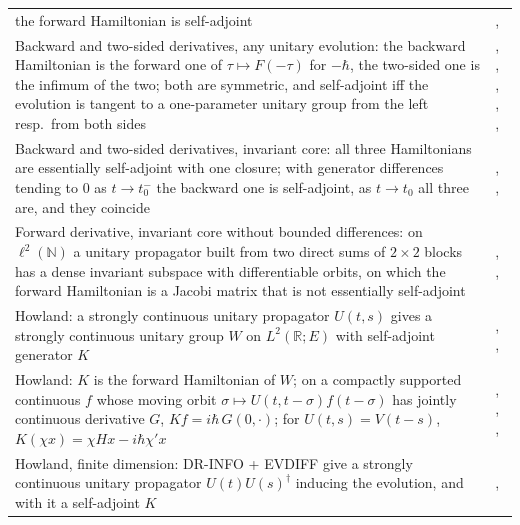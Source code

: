 \documentclass[11pt]{article}
\begin{document}
\begin{xltabular}{\textwidth}{@{}BL@{}}
  the forward Hamiltonian is self-adjoint &
  ,  \\
Backward and two-sided derivatives, any unitary evolution: the backward Hamiltonian is the
  forward one of $\tau \mapsto F(-\tau)$ for $-\hbar$, the two-sided one is the infimum of the
  two; both are symmetric, and self-adjoint iff the evolution is tangent to a one-parameter
  unitary group from the left resp.\ from both sides &
  , ,
  , ,
  ,  \\
Backward and two-sided derivatives, invariant core: all three Hamiltonians are essentially
  self-adjoint with one closure; with generator differences tending to $0$ as $t \to t_0^-$
  the backward one is self-adjoint, as $t \to t_0$ all three are, and they coincide &
  , ,
   \\
Forward derivative, invariant core without bounded differences: on $\ell^2(\mathbb{N})$ a
  unitary propagator built from two direct sums of $2 \times 2$ blocks has a dense invariant
  subspace with differentiable orbits, on which the forward Hamiltonian is a Jacobi matrix that
  is not essentially self-adjoint &
  , ,
   \\
Howland: a strongly continuous unitary propagator $U(t,s)$ gives a strongly continuous unitary
  group $W$ on $L^2(\mathbb{R};E)$ with self-adjoint generator $K$ &
  , ,
   \\
Howland: $K$ is the forward Hamiltonian of $W$; on a compactly supported continuous $f$ whose
  moving orbit $\sigma \mapsto U(t,t-\sigma)f(t-\sigma)$ has jointly continuous derivative $G$,
  $Kf = i\hbar\,G(0,\cdot)$; for $U(t,s) = V(t-s)$, $K(\chi x) = \chi Hx - i\hbar\chi' x$ &
  , ,
  ,  \\
Howland, finite dimension: DR-INFO + EVDIFF give a strongly continuous unitary propagator
  $U(t)U(s)^\dagger$ inducing the evolution, and with it a self-adjoint $K$ &
  ,
   \\
\end{xltabular}
\end{document}
